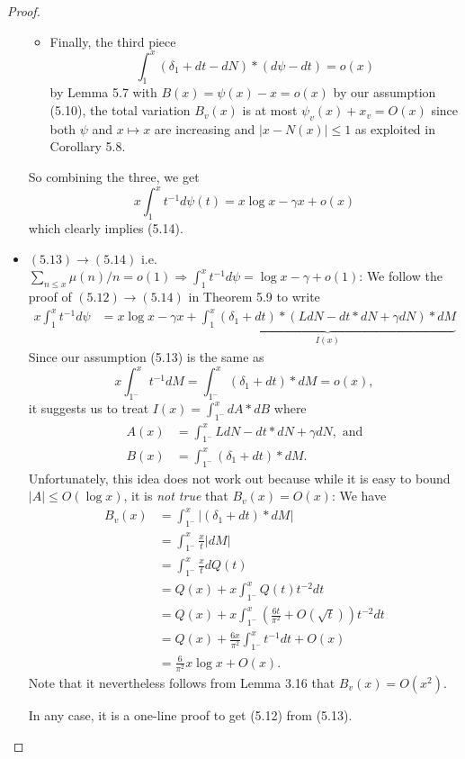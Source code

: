 \documentclass[12pt]{article}
\begin{document}
\begin{proof}
\begin{itemize}
\begin{itemize}
\item Finally, the third piece
$$\int_1^x (\delta_1 + dt - dN) * (d\psi - dt) = o(x)$$
by Lemma 5.7 with $B(x) = \psi(x) - x = o(x)$ by our assumption (5.10), the total variation $B_v(x)$ is at most $\psi_v(x) + x_v = O(x)$ since both $\psi$ and $x \mapsto x$ are increasing and $|x - N(x)| \leq 1$ as exploited in Corollary 5.8.
\end{itemize}
So combining the three, we get
$$x \int_1^x t^{-1} d\psi(t) = x \log x - \gamma x + o(x)$$
which clearly implies (5.14).

\item $(5.13) \longrightarrow (5.14)$ i.e. $\sum_{n \leq x} \mu(n)/n = o(1) \Rightarrow \int_1^x t^{-1} d\psi = \log x - \gamma + o(1)$: We follow the proof of $(5.12) \longrightarrow (5.14)$ in Theorem 5.9 to write
\begin{align*}
x \int_1^x t^{-1} d\psi &= x \log x - \gamma x + \underbrace{\int_1^x (\delta_1 + dt) * (L dN - dt * dN + \gamma dN) * dM}_{I(x)}
\end{align*}
Since our assumption (5.13) is the same as
$$x \int_{1^-}^x t^{-1} dM = \int_{1^-}^x (\delta_1 + dt) * dM = o(x),$$
it suggests us to treat $I(x) = \int_{1^-}^x dA * dB$ where 
\begin{align*}
A(x) &= \int_{1^-}^x L dN - dt * dN + \gamma dN, \text{ and}\\
B(x) &= \int_{1^-}^x (\delta_1 + dt) * dM.
\end{align*}
Unfortunately, this idea does not work out because while it is easy to bound $|A| \leq O(\log x)$, it is \emph{not true} that $B_v(x) = O(x)$: We have
\begin{align*}
B_v(x) &= \int_{1^-}^x |(\delta_1 + dt) * dM|\\
&= \int_{1^-}^x \frac{x}{t} |dM|\\
&= \int_{1^-}^x \frac{x}{t} dQ(t)\\
&= Q(x) + x \int_{1^-}^x Q(t) t^{-2} dt\\
&= Q(x) + x \int_{1^-}^x \left( \frac{6t}{\pi^2} + O(\sqrt{t}) \right) t^{-2} dt\\
&= Q(x) + \frac{6x}{\pi^2} \int_{1^-}^x t^{-1} dt + O(x)\\
&= \frac{6}{\pi^2} x \log x + O(x).
\end{align*}
Note that it nevertheless follows from Lemma 3.16 that $B_v(x) = O(x^2)$.

In any case, it is a one-line proof to get (5.12) from (5.13).
\end{itemize}
\end{proof}

\unless\ifdefined\IsMainDocument
\end{document}
